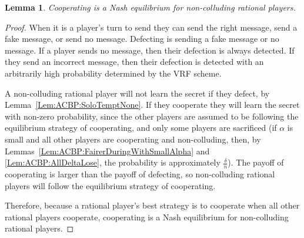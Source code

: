 \documentclass[12pt]{article}
\newtheorem{lemma}{Lemma}
\begin{document}
\begin{lemma}Cooperating is a Nash equilibrium for non-colluding rational players.\end{lemma}
\begin{proof}
When it is a player's turn to send they can send the right message, send a fake message, or send no message. Defecting is sending a fake message or no message. If a player sends no message, then their defection is always detected. If they send an incorrect message, then their defection is detected with an arbitrarily high probability determined by the VRF scheme.

A non-colluding rational player will not learn the secret if they defect, by Lemma~\ref{Lem:ACBP:SoloTemptNone}. If they cooperate they will learn the secret with non-zero probability, since the other players are assumed to be following the equilibrium strategy of cooperating, and only some players are sacrificed (if $\alpha$ is small and all other players are cooperating and non-colluding, then, by Lemmas~\ref{Lem:ACBP:FairerDuringWithSmallAlpha} and \ref{Lem:ACBP:AllDeltaLose}, the probability is approximately $\frac{\delta}{n}$). The payoff of cooperating is larger than the payoff of defecting, so non-colluding rational players will follow the equilibrium strategy of cooperating.

Therefore, because a rational player's best strategy is to cooperate when all other rational players cooperate, cooperating is a Nash equilibrium for non-colluding rational players. 
\end{proof}
\end{document}
